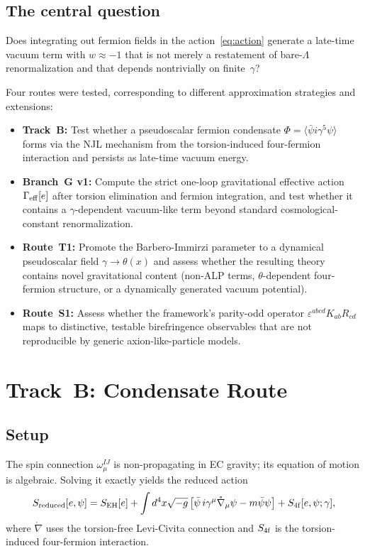 \documentclass[11pt,letterpaper]{article}
\newcommand{\BI}{\gamma}               %
\newcommand{\Gam}{\Gamma_{\rm eff}}
\newcommand{\Sfour}{S_{\rm 4f}}
\begin{document}
\subsection{The central question}

Does integrating out fermion fields in the action~\eqref{eq:action} generate a
late-time vacuum term with $w\approx -1$ that is not merely a restatement of
bare-$\Lambda$ renormalization and that depends nontrivially on finite~$\BI$?

Four routes were tested, corresponding to different approximation strategies
and extensions:
\begin{itemize}
  \item \textbf{Track~B:} Test whether a pseudoscalar fermion condensate
    $\Phi = \langle\bar\psi i\gamma^5\psi\rangle$ forms via the NJL mechanism
    from the torsion-induced four-fermion interaction and persists as
    late-time vacuum energy.
  \item \textbf{Branch~G v1:} Compute the strict one-loop gravitational
    effective action $\Gam[e]$ after torsion elimination and fermion
    integration, and test whether it contains a $\BI$-dependent vacuum-like
    term beyond standard cosmological-constant renormalization.
  \item \textbf{Route~T1:} Promote the Barbero-Immirzi parameter to a
    dynamical pseudoscalar field $\BI\to\theta(x)$ and assess whether the
    resulting theory contains novel gravitational content (non-ALP terms,
    $\theta$-dependent four-fermion structure, or a dynamically generated
    vacuum potential).
  \item \textbf{Route~S1:} Assess whether the framework's parity-odd operator
    $\varepsilon^{abcd}K_{ab}R_{cd}$ maps to distinctive, testable
    birefringence observables that are not reproducible by generic
    axion-like-particle models.
\end{itemize}


\section{Track~B: Condensate Route}\label{sec:trackB}

\subsection{Setup}\label{sec:trackB_setup}

The spin connection $\omega^{IJ}_\mu$ is non-propagating in EC gravity; its
equation of motion is algebraic. Solving it exactly yields the reduced
action~\cite{Freidel2005,ShapiroTeixeira2014}
\begin{equation}\label{eq:Sreduced}
  S_{\rm reduced}[e,\psi] = S_{\rm EH}[e]
  + \int d^4x\sqrt{-g}\,\bigl[\bar\psi\,i\gamma^\mu\mathring\nabla_\mu\psi
    - m\bar\psi\psi\bigr]
  + \Sfour[e,\psi;\BI],
\end{equation}
where $\mathring\nabla$ uses the torsion-free Levi-Civita connection and
$\Sfour$ is the torsion-induced four-fermion interaction.
\end{document}
